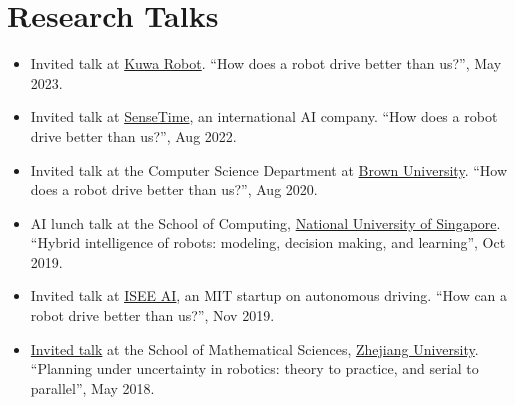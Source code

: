 \documentclass[10pt,letterpaper,sans]{moderncv}        %
\begin{document}
\section{Research Talks}
\begin{itemize}
    \item Invited talk at \underline{Kuwa Robot}. ``How does a robot drive better than us?'', May 2023.
    \item Invited talk at \underline{SenseTime}, an international AI company. ``How does a robot drive better than us?'', Aug 2022.
    \item Invited talk at the Computer Science Department at \underline{Brown University}. ``How does a robot drive better than us?'', Aug 2020.
    \item AI lunch talk at the School of Computing, \underline{National University of Singapore}. ``Hybrid intelligence of robots: modeling, decision making, and learning'', Oct 2019.
    \item Invited talk at \href{https://www.isee.ai/}{\underline{ISEE AI}}, an MIT startup on autonomous driving. ``How can a robot drive better than us?'', Nov 2019.
    \item \href{http://www.math.zju.edu.cn/mathen/2018/0509/c38278a1596436/page.htm}{Invited talk} at the School of Mathematical Sciences, \underline{Zhejiang University}. ``Planning under uncertainty in robotics: theory to practice, and serial to parallel'', May 2018.
\end{itemize}

\end{document}
